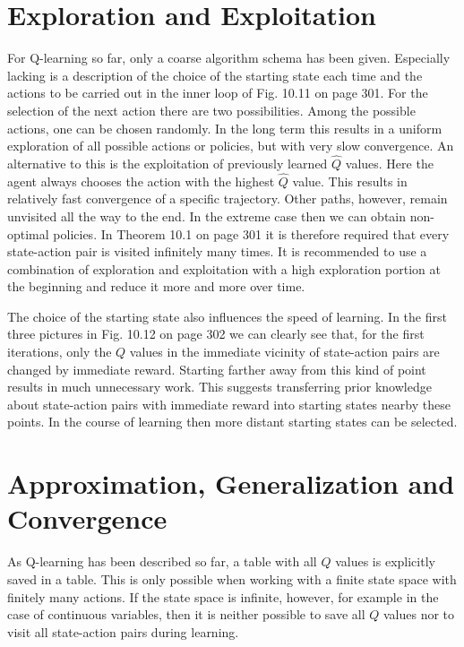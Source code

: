 \documentclass[10pt]{book}
\begin{document}
\section{Exploration and Exploitation}
For Q-learning so far, only a coarse algorithm schema has been given. Especially lacking is a description of the choice of the starting state each time and the actions to be carried out in the inner loop of Fig. 10.11 on page 301. For the selection of the next action there are two possibilities. Among the possible actions, one can be chosen randomly. In the long term this results in a uniform exploration of all possible actions or policies, but with very slow convergence. An alternative to this is the exploitation of previously learned $\hat{Q}$ values. Here the agent always chooses the action with the highest $\hat{Q}$ value. This results in relatively fast convergence of a specific trajectory. Other paths, however, remain unvisited all the way to the end. In the extreme case then we can obtain non-optimal policies. In Theorem 10.1 on page 301 it is therefore required that every state-action pair is visited infinitely many times. It is recommended to use a combination of exploration and exploitation with a high exploration portion at the beginning and reduce it more and more over time.

The choice of the starting state also influences the speed of learning. In the first three pictures in Fig. 10.12 on page 302 we can clearly see that, for the first iterations, only the $Q$ values in the immediate vicinity of state-action pairs are changed by immediate reward. Starting farther away from this kind of point results in much unnecessary work. This suggests transferring prior knowledge about state-action pairs with immediate reward into starting states nearby these points. In the course of learning then more distant starting states can be selected.

\section{Approximation, Generalization and Convergence}
As Q-learning has been described so far, a table with all $Q$ values is explicitly saved in a table. This is only possible when working with a finite state space with finitely many actions. If the state space is infinite, however, for example in the case of continuous variables, then it is neither possible to save all $Q$ values nor to visit all state-action pairs during learning.
\end{document}
